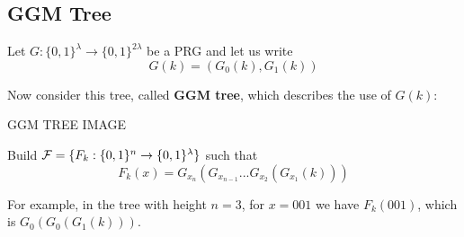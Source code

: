 \subsection{GGM Tree}

\begin{construction}
    Let $G:\{0,1\}^{\lambda} \to \{0,1\}^{2\lambda} $ be a PRG and let us write 
    \[
        G(k)=(G_{0}(k), G_{1}(k))
    \]

    Now consider this tree, called \textbf{GGM tree}, which describes the use of
    $G(k)$:

    GGM TREE IMAGE


    Build $\mathcal{F}=\{ F_{k}:\{0,1\}^{n} \to \{0,1\}^{\lambda} \}$ such that 
    \[
        F_{k}(x)=G_{x_{n}}(G_{x_{n-1}}... G_{x_{2}}(G_{x_{1}}(k)))
    \]
\end{construction}

For example, in the tree with height $n=3$,  for $x=001$ we have $F_{k}(001)$, which is
$G_{0}(G_{0}(G_{1}(k)))$.

